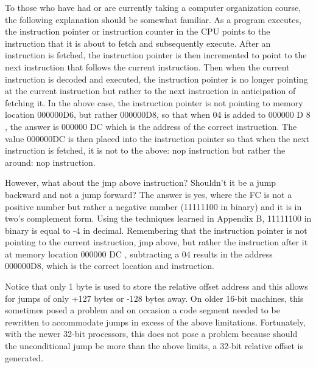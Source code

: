 \documentclass[10pt]{book}
\begin{document}
\begin{center}
\begin{center}
\begin{center}
\begin{center}
\begin{center}
To those who have had or are currently taking a computer organization course, the following explanation should be somewhat familiar. As a program executes, the instruction pointer or instruction counter in the CPU points to the instruction that it is about to fetch and subsequently execute. After an instruction is fetched, the instruction pointer is then incremented to point to the next instruction that follows the current instruction. Then when the current instruction is decoded and executed, the instruction pointer is no longer pointing at the current instruction but rather to the next instruction in anticipation of fetching it. In the above case, the instruction pointer is not pointing to memory location 000000D6, but rather 000000D8, so that when 04 is added to 000000 D 8 , the answer is 000000 DC which is the address of the correct instruction. The value 000000DC is then placed into the instruction pointer so that when the next instruction is fetched, it is not to the above: nop instruction but rather the around: nop instruction.

However, what about the jmp above instruction? Shouldn't it be a jump backward and not a jump forward? The answer is yes, where the FC is not a positive number but rather a negative number (11111100 in binary) and it is in two's complement form. Using the techniques learned in Appendix B, 11111100 in binary is equal to -4 in decimal. Remembering that the instruction pointer is not pointing to the current instruction, jmp above, but rather the instruction after it at memory location 000000 DC , subtracting a 04 results in the address 000000D8, which is the correct location and instruction.

Notice that only 1 byte is used to store the relative offset address and this allows for jumps of only +127 bytes or -128 bytes away. On older 16-bit machines, this sometimes posed a problem and on occasion a code segment needed to be rewritten to accommodate jumps in excess of the above limitations. Fortunately, with the newer 32-bit processors, this does not pose a problem because should the unconditional jump be more than the above limits, a 32-bit relative offset is generated.


\end{center}
\end{center}
\end{center}
\end{center}
\end{center}
\end{document}
